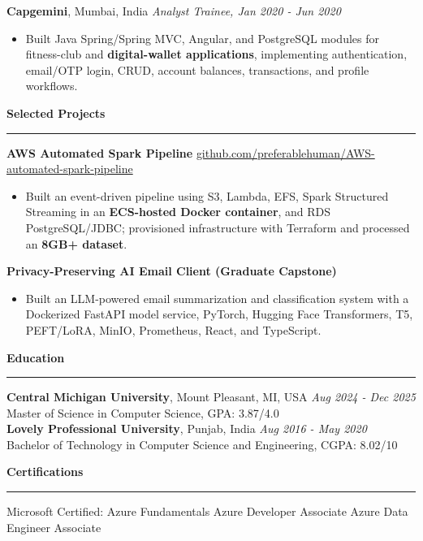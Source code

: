 \documentclass[11pt,letterpaper]{article}
\newcommand{\ressection}[1]{\Needspace{6\baselineskip}\vspace{8pt}\par\textbf{#1}\par\vspace{2pt}\hrule\vspace{5pt}}
\begin{document}
\textbf{Capgemini}, Mumbai, India \hfill \textit{Analyst Trainee, Jan 2020 - Jun 2020}
\begin{itemize}
  \item Built Java Spring/Spring MVC, Angular, and PostgreSQL modules for fitness-club and \textbf{digital-wallet applications}, implementing authentication, email/OTP login, CRUD, account balances, transactions, and profile workflows.
\end{itemize}

\ressection{Selected Projects}
\textbf{AWS Automated Spark Pipeline} \hfill \href{https://github.com/preferablehuman/AWS-automated-spark-pipeline}{github.com/preferablehuman/AWS-automated-spark-pipeline}
\begin{itemize}
  \item Built an event-driven pipeline using S3, Lambda, EFS, Spark Structured Streaming in an \textbf{ECS-hosted Docker container}, and RDS PostgreSQL/JDBC; provisioned infrastructure with Terraform and processed an \textbf{8GB+ dataset}.
\end{itemize}
\vspace{2pt}
\textbf{Privacy-Preserving AI Email Client (Graduate Capstone)}
\begin{itemize}
  \item Built an LLM-powered email summarization and classification system with a Dockerized FastAPI model service, PyTorch, Hugging Face Transformers, T5, PEFT/LoRA, MinIO, Prometheus, React, and TypeScript.
\end{itemize}

\ressection{Education}
\textbf{Central Michigan University}, Mount Pleasant, MI, USA \hfill \textit{Aug 2024 - Dec 2025}\\
Master of Science in Computer Science, GPA: 3.87/4.0\\[2pt]
\textbf{Lovely Professional University}, Punjab, India \hfill \textit{Aug 2016 - May 2020}\\
Bachelor of Technology in Computer Science and Engineering, CGPA: 8.02/10

\ressection{Certifications}
Microsoft Certified: Azure Fundamentals \textbar{} Azure Developer Associate \textbar{} Azure Data Engineer Associate
\end{document}
